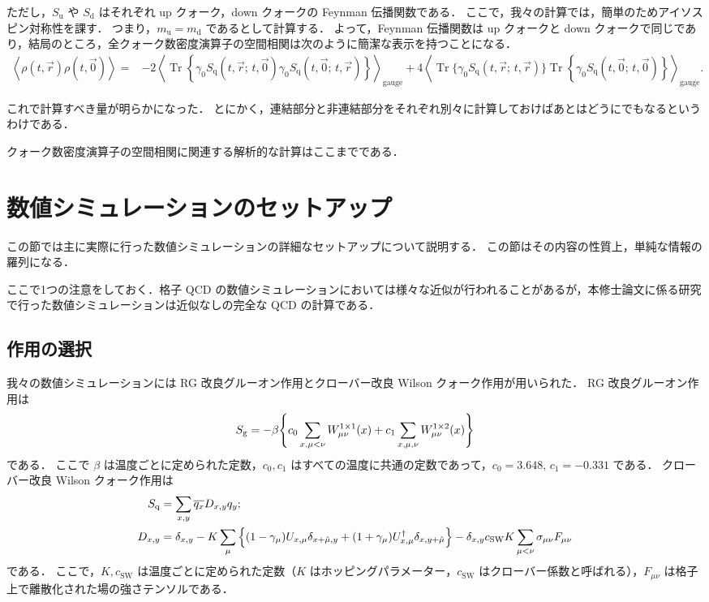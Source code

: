 \documentclass[dvipdfmx, a4paper]{jarticle}
\numberwithin{equation}{section}
\begin{document}
ただし，$S_\mathrm{u}$ や $S_\mathrm{d}$ はそれぞれ up クォーク，down クォークの Feynman 伝播関数である．
ここで，我々の計算では，簡単のためアイソスピン対称性を課す．
つまり，$m_\mathrm{u} = m_\mathrm{d}$ であるとして計算する．
よって，Feynman 伝播関数は up クォークと down クォークで同じであり，結局のところ，全クォーク数密度演算子の空間相関は次のように簡潔な表示を持つことになる．
\begin{align}
    \left\langle
  \rho(t,\vec r)\rho(t,\vec 0)
  \right\rangle
  ={}&
  -2\left\langle
  \operatorname{Tr}
  \left\{
  \gamma_0
  S_\mathrm{q}(t,\vec r;\,t,\vec 0)
  \gamma_0
  S_\mathrm{q}(t,\vec 0;\,t,\vec r)
  \right\}
  \right\rangle_\mathrm{gauge}
  +
  4\left\langle
  \operatorname{Tr}
  \Big\{
  \gamma_0
  S_\mathrm{q}(t,\vec r;\,t,\vec r)
  \Big\}
  \operatorname{Tr}
  \left\{
  \gamma_0
  S_\mathrm{q}(t,\vec 0;\,t,\vec 0)
  \right\}
  \right\rangle_\mathrm{gauge} .
\end{align}

これで計算すべき量が明らかになった．
とにかく，連結部分と非連結部分をそれぞれ別々に計算しておけばあとはどうにでもなるというわけである．

クォーク数密度演算子の空間相関に関連する解析的な計算はここまでである．

\newpage
\section{数値シミュレーションのセットアップ}
この節では主に実際に行った数値シミュレーションの詳細なセットアップについて説明する．
この節はその内容の性質上，単純な情報の羅列になる．

ここで1つの注意をしておく．格子 QCD の数値シミュレーションにおいては様々な近似が行われることがあるが，本修士論文に係る研究で行った数値シミュレーションは近似なしの完全な QCD の計算である．

\subsection{作用の選択}
我々の数値シミュレーションには RG 改良グルーオン作用とクローバー改良 Wilson クォーク作用が用いられた．
RG 改良グルーオン作用は
\begin{align}
  S_\mathrm{g} = -\beta \qty{c_0 \sum_{x, \mu < \nu} W_{\mu\nu}^{1\times 1}(x) + c_1\sum_{x, \mu, \nu}W_{\mu\nu}^{1 \times 2}(x)}
\end{align}
である．
ここで $\beta$ は温度ごとに定められた定数，$c_0, c_1$ はすべての温度に共通の定数であって，$c_0 = 3.648, \, c_1 = -0.331$ である．
クローバー改良 Wilson クォーク作用は
\begin{align}
  S_\mathrm{q} &= \sum_{x, y} \overline{q_x} D_{x, y} q_y;\\
  D_{x,y} &= \delta_{x,y} - K\sum_{\mu}\Big\{\qty(1-\gamma_\mu)U_{x,\mu}\delta_{x + \hat{\mu}, y}
                                            + (1+\gamma_\mu)U^\dagger_{x, \mu}\delta_{x, y + \hat{\mu}}\Big\} - \delta_{x,y}c_\mathrm{SW} K \sum_{\mu < \nu} \sigma_{\mu\nu} F_{\mu\nu}
\end{align}
である．
ここで，$K, c_\mathrm{SW}$ は温度ごとに定められた定数（$K$ はホッピングパラメーター，$c_\mathrm{SW}$ はクローバー係数と呼ばれる），$F_{\mu\nu}$ は格子上で離散化された場の強さテンソルである．
\end{document}
